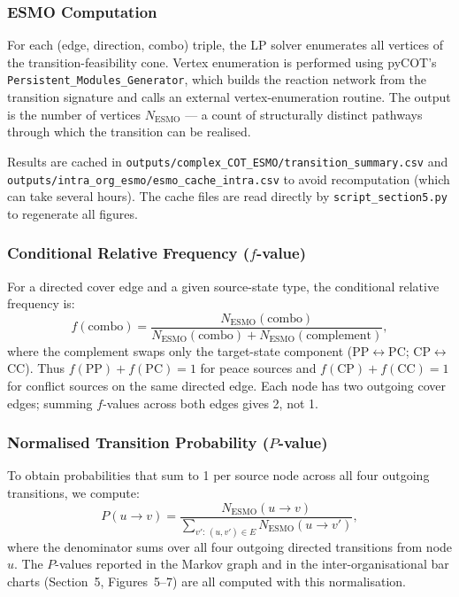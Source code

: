 \subsubsection*{ESMO Computation}

For each (edge, direction, combo) triple, the LP solver enumerates all
vertices of the transition-feasibility cone.  Vertex enumeration is
performed using pyCOT's \texttt{Persistent\_Modules\_Generator}, which
builds the reaction network from the transition signature and calls an
external vertex-enumeration routine.  The output is the number of vertices
$N_{\text{ESMO}}$ — a count of structurally distinct pathways through which
the transition can be realised.

Results are cached in \texttt{outputs/complex\_COT\_ESMO/transition\_summary.csv}
and \texttt{outputs/intra\_org\_esmo/esmo\_cache\_intra.csv} to avoid
recomputation (which can take several hours).  The cache files are read
directly by \texttt{script\_section5.py} to regenerate all figures.

\subsubsection*{Conditional Relative Frequency ($f$-value)}

For a directed cover edge and a given source-state type, the conditional
relative frequency is:
\begin{equation}
    f(\text{combo}) = \frac{N_{\text{ESMO}}(\text{combo})}
                          {N_{\text{ESMO}}(\text{combo}) + N_{\text{ESMO}}(\text{complement})},
\end{equation}
where the complement swaps only the target-state component
(PP$\leftrightarrow$PC; CP$\leftrightarrow$CC).
Thus $f(\text{PP}) + f(\text{PC}) = 1$ for peace sources and
$f(\text{CP}) + f(\text{CC}) = 1$ for conflict sources on the same
directed edge.  Each node has two outgoing cover edges; summing $f$-values
across both edges gives 2, not 1.

\subsubsection*{Normalised Transition Probability ($P$-value)}

To obtain probabilities that sum to 1 per source node across all four
outgoing transitions, we compute:
\begin{equation}
    P(u \to v) = \frac{N_{\text{ESMO}}(u \to v)}
                      {\displaystyle\sum_{v':\,(u,v')\in E} N_{\text{ESMO}}(u \to v')},
\end{equation}
where the denominator sums over all four outgoing directed transitions
from node $u$.  The $P$-values reported in the Markov graph and in the
inter-organisational bar charts (Section~5, Figures~5--7) are all
computed with this normalisation.

